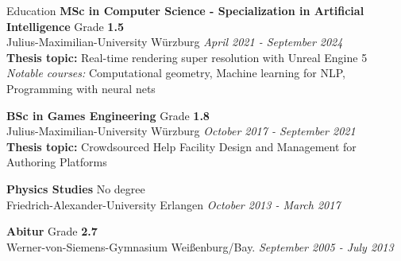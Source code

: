 \documentclass{resume} %
\begin{document}
\begin{rSection}{Education}
{\bf MSc in Computer Science - Specialization in Artificial Intelligence} \hfill {Grade \bf1.5} 
\\ Julius-Maximilian-University Würzburg \hfill {\em April 2021 - September 2024}
\\ {\small {\bf Thesis topic:} Real-time rendering super resolution with Unreal Engine 5}
\\ {\small {\em Notable courses:} Computational geometry, Machine learning for NLP, Programming with neural nets} 

{\small
{\bf BSc in Games Engineering} \hfill {Grade \bf 1.8} 
\\ Julius-Maximilian-University Würzburg \hfill {\em October 2017 - September 2021}
}
\\ {\small {\bf Thesis topic:} Crowdsourced Help Facility Design and Management for Authoring Platforms}

{\small
{\bf Physics Studies} \hfill {No degree} 
\\ Friedrich-Alexander-University Erlangen \hfill {\em October 2013 - March 2017}
}

{\small
{\bf Abitur} \hfill {Grade \bf 2.7} 
\\ Werner-von-Siemens-Gymnasium Weißenburg/Bay. \hfill {\em September 2005 - July 2013}
}

\end{rSection}
\end{document}
